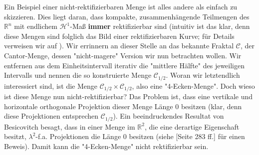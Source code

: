 Ein Beispiel einer nicht-rektifizierbaren Menge ist alles andere als einfach zu skizzieren. Dies liegt daran, dass kompakte, zusammenhängende Teilmengen des \(\mathbb{R}^n\) mit endlichem \(\mathcal{H}^1\)-Maß \textbf{immer} rektifizierbar sind (intuitiv ist das klar, denn diese Mengen sind folglich das Bild einer rektifizierbaren Kurve; für Details verweisen wir auf \cite{falconer1985geometry}). Wir errinnern an dieser Stelle an das bekannte Fraktal \(\mathcal{C}\), der Cantor-Menge, dessen "nicht-magere" Version wir nun betrachten wollen. Wir entfernen aus dem Einheitsintervall iterativ die "mittlere Hälfte" des jeweiligen Intervalls und nennen die so konstruierte Menge \(\mathcal{C}_{1/2}\). Woran wir letztendlich interessiert sind, ist die Menge \(\mathcal{C}_{1/2} \times \mathcal{C}_{1/2}\), also eine "4-Ecken-Menge". Doch wieso ist diese Menge nun nicht-rektifizierbar? Das Problem ist, dass eine vertikale und horizontale orthogonale Projektion dieser Menge Länge 0 besitzen (klar, denn diese Projektionen entsprechen \(\mathcal{C}_{1/2}\)). Ein beeindruckendes Resultat von Besicovitch besagt, dass in einer Menge im \(\mathbb{R}^2\), die eine derartige Eigenschaft besitzt, \(\lambda^2\)-f.a. Projektionen die Länge 0 besitzen (siehe \cite{bishop2017fractals}[Seite 283 ff.] für einen Beweis). Damit kann die "4-Ecken-Menge" nicht rektifizierbar sein.
